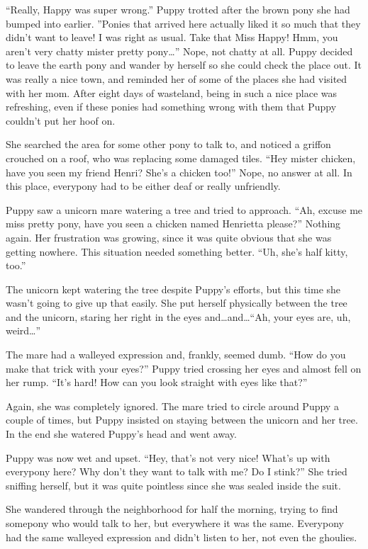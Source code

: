 ``Really, Happy was super wrong.'' Puppy trotted after the brown pony she had bumped into earlier. ''Ponies that arrived here actually liked it so much that they didn't want to leave! I was right as usual. Take that Miss Happy! Hmm, you aren't very chatty mister pretty pony\dots'' Nope, not chatty at all. Puppy decided to leave the earth pony and wander by herself so she could check the place out. It was really a nice town, and reminded her of some of the places she had visited with her mom. After eight days of wasteland, being in such a nice place was refreshing, even if these ponies had something wrong with them that Puppy couldn't put her hoof on.

She searched the area for some other pony to talk to, and noticed a griffon crouched on a roof, who was replacing some damaged tiles. ``Hey mister chicken, have you seen my friend Henri? She's a chicken too!'' Nope, no answer at all. In this place, everypony had to be either deaf or really unfriendly.

Puppy saw a unicorn mare watering a tree and tried to approach. ``Ah, excuse me miss pretty pony, have you seen a chicken named Henrietta please?'' Nothing again. Her frustration was growing, since it was quite obvious that she was getting nowhere. This situation needed something better. ``Uh, she's half kitty, too.''

The unicorn kept watering the tree despite Puppy's efforts, but this time she wasn't going to give up that easily. She put herself physically between the tree and the unicorn, staring her right in the eyes and\dots and\dots ``Ah, your eyes are, uh, weird\dots''

The mare had a walleyed expression and, frankly, seemed dumb. ``How do you make that trick with your eyes?'' Puppy tried crossing her eyes and almost fell on her rump. ``It's hard! How can you look straight with eyes like that?''

Again, she was completely ignored. The mare tried to circle around Puppy a couple of times, but Puppy insisted on staying between the unicorn and her tree. In the end she watered Puppy's head and went away.

Puppy was now wet and upset. ``Hey, that's not very nice! What's up with everypony here? Why don't they want to talk with me? Do I stink?'' She tried sniffing herself, but it was quite pointless since she was sealed inside the suit.

She wandered through the neighborhood for half the morning, trying to find somepony who would talk to her, but everywhere it was the same. Everypony had the same walleyed expression and didn't listen to her, not even the ghoulies.


